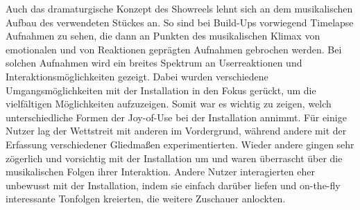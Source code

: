 Auch das dramaturgische Konzept des Showreels lehnt sich an dem musikalischen Aufbau des verwendeten Stückes an. So sind bei Build-Ups vorwiegend Timelapse Aufnahmen zu sehen, die dann an Punkten des musikalischen Klimax von emotionalen und von Reaktionen geprägten Aufnahmen gebrochen werden. Bei solchen Aufnahmen wird ein breites Spektrum an Userreaktionen und Interaktionsmöglichkeiten gezeigt. Dabei wurden verschiedene Umgangsmöglichkeiten mit der Installation in den Fokus gerückt, um die vielfältigen Möglichkeiten aufzuzeigen. Somit war es wichtig zu zeigen, welch unterschiedliche Formen der Joy-of-Use bei der Installation annimmt. Für einige Nutzer lag der Wettstreit mit anderen im Vordergrund, während andere mit der Erfassung verschiedener Gliedmaßen experimentierten. Wieder andere gingen sehr zögerlich und vorsichtig mit der Installation um und waren überrascht über die musikalischen Folgen ihrer Interaktion. Andere Nutzer interagierten eher unbewusst mit der Installation, indem sie einfach darüber liefen und on-the-fly interessante Tonfolgen kreierten, die weitere Zuschauer anlockten.